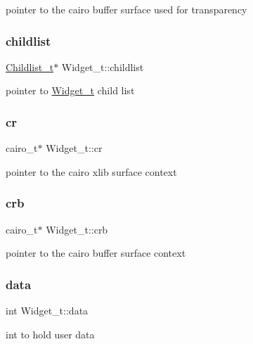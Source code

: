 pointer to the cairo buffer surface used for transparency \mbox{\label{structWidget__t_ac203ccbc58958a7c205897d4aba197e9}} 
\subsubsection{\texorpdfstring{childlist}{childlist}}
{\footnotesize\ttfamily \hyperlink{structChildlist__t}{Childlist\+\_\+t}$\ast$ Widget\+\_\+t\+::childlist}

pointer to \hyperlink{structWidget__t}{Widget\+\_\+t} child list \mbox{\label{structWidget__t_a26594f6ffabe98fc08f9207150fc9417}} 
\subsubsection{\texorpdfstring{cr}{cr}}
{\footnotesize\ttfamily cairo\+\_\+t$\ast$ Widget\+\_\+t\+::cr}

pointer to the cairo xlib surface context \mbox{\label{structWidget__t_ad98022ee160d4c0906110868fc9e5664}} 
\subsubsection{\texorpdfstring{crb}{crb}}
{\footnotesize\ttfamily cairo\+\_\+t$\ast$ Widget\+\_\+t\+::crb}

pointer to the cairo buffer surface context \mbox{\label{structWidget__t_a9dd7b58be77bf31ab021aa627a73186a}} 
\subsubsection{\texorpdfstring{data}{data}}
{\footnotesize\ttfamily int Widget\+\_\+t\+::data}

int to hold user data \mbox{\label{structWidget__t_a5ae8f0fdd24c6baf15173dc0cc9ae360}} 
